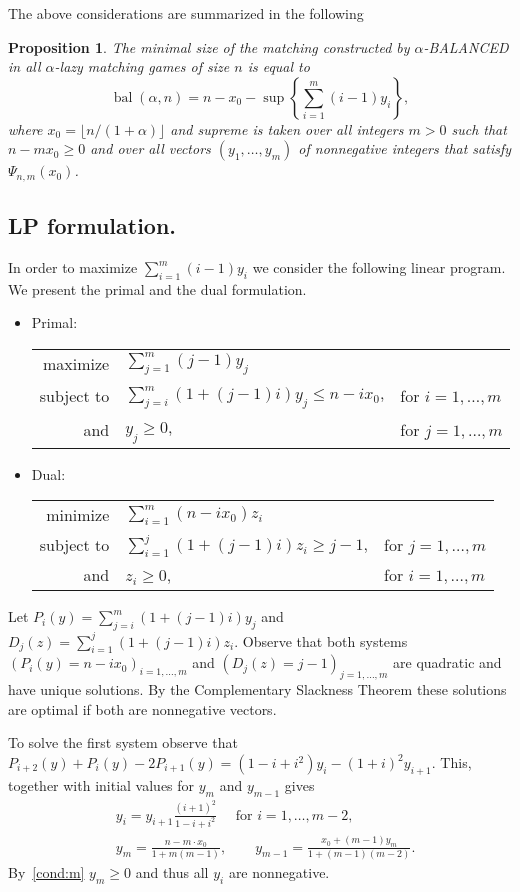 \documentclass[12pt]{amsart}
\renewcommand{\leq}{\leqslant}
\renewcommand{\geq}{\geqslant}
\newtheorem{prop}[theorem]{Proposition}
\theoremstyle{definition}
\newcommand{\Alg}[0]{\textsf{BALANCED}\xspace}
\DeclareMathOperator{\bal}{bal}
\newcommand{\eqB}{\Psi}
\begin{document}
The above considerations are summarized in the following
\begin{prop}
 The minimal size of the matching constructed by $\alpha$-\Alg{} in all $\alpha$-lazy matching games of size $n$ is equal to
 $$\bal(\alpha,n)= n -x_0- \sup\left\{\sum_{i=1}^m (i-1) y_i \right\},$$
 where $x_0=\lfloor n/(1+\alpha)\rfloor$ and supreme is taken over all integers $m>0$ such that $n-mx_0\geq0$ and over all vectors $(y_1,\ldots,y_m)$ of nonnegative integers that satisfy $\eqB_{n,m}(x_0)$.
\end{prop}

\subsection{LP formulation.}
In order to maximize $\sum_{i=1}^m (i-1) y_i$ we consider the following linear program. We present the primal and the dual formulation.
\begin{itemize}
 \item Primal:
 
 \begin{tabular}{rll}
  maximize    & $\sum_{j=1}^m (j-1)y_j$\\
  subject to  &  $\sum_{j=i}^m (1+(j-1)i)y_j \leq n- ix_0$, & for $i=1,\ldots,m$\\
  and         &  $y_j \geq 0$, & for $j=1,\ldots,m$
 \end{tabular}

 \item Dual:
 
 \begin{tabular}{rll}
  minimize    & $\sum_{i=1}^m (n-ix_0)z_i$\\
  subject to  &  $\sum_{i=1}^j (1+(j-1)i)z_i \geq j-1$, & for $j=1,\ldots,m$\\
  and         &  $z_i \geq 0$, & for $i=1,\ldots,m$
 \end{tabular}
\end{itemize}
Let $P_i(y) = \sum_{j=i}^m (1+(j-1)i)y_j$ and $D_j(z) = \sum_{i=1}^j (1+(j-1)i)z_i$. 
Observe that both systems $(P_i(y) = n-ix_0)_{i=1, \ldots, m}$ and $(D_j(z) = j-1)_{j=1, \ldots, m}$ are quadratic and have unique solutions. 
By the Complementary Slackness Theorem these solutions are optimal if both are nonnegative vectors.

To solve the first system observe that $P_{i+2}(y)+P_{i}(y) - 2P_{i+1}(y) = (1-i+i^2)y_{i}-(1+i)^2y_{i+1}$. 
This, together with initial values for $y_m$ and $y_{m-1}$ gives 
\begin{align}
 & y_i= y_{i+1} \frac{(i+1)^2}{1-i+i^2} \quad \text{ for $i=1, \ldots,m-2$},\label{solution:yi} \\
 & y_m  =  \frac{n-m \cdot x_0}{1+m(m-1)},\quad \quad y_{m-1}= \frac{x_0+(m-1)y_m}{1+(m-1)(m-2)}.\label{solution:ym}
\end{align}
By~\eqref{cond:m} $y_m\geq0$ and thus all $y_i$ are nonnegative.
\end{document}
